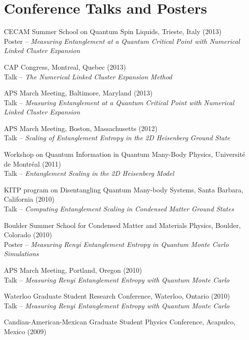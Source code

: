 \documentclass[letterpaper]{article}
\renewenvironment{itemize}{
  \begin{list}{}{
    \setlength{\leftmargin}{1.5em}
  }
}{
  \end{list}
}
\begin{document}
\section*{Conference Talks and Posters}

\begin{itemize}
\item CECAM Summer School on Quantum Spin Liquids, Trieste, Italy (2013) \\
	Poster --  {\it Measuring Entanglement at a Quantum Critical Point with Numerical Linked Cluster Expansion}
\item CAP Congress, Montreal, Quebec (2013) \\
	Talk --  {\it The Numerical Linked Cluster Expansion Method}
\item APS March Meeting, Baltimore, Maryland (2013) \\
	Talk --  {\it Measuring Entanglement at a Quantum Critical Point with Numerical Linked Cluster Expansion}
\item APS March Meeting, Boston, Massachusetts (2012) \\
	Talk --  {\it Scaling of Entanglement Entropy in the 2D Heisenberg Ground State}
\item Workshop on Quantum Information in Quantum Many-Body Physics, Universit\'e de Montr\'eal  (2011) \\ Talk --  {\it Entanglement Scaling in the 2D Heisenberg Model}
\item KITP program on Disentangling Quantum Many-body Systems, Santa Barbara, California (2010) \\
 	Talk -- {\it Computing Entanglement Scaling in Condensed Matter Ground States}
\item Boulder Summer School for Condensed Matter and Materials Physics, Boulder, Colorado (2010)\\
	Poster -- {\it Measuring Renyi Entanglement Entropy in Quantum Monte Carlo Simulations}
\item APS March Meeting, Portland, Oregon (2010) \\
	Talk --  {\it Measuring Renyi Entanglement Entropy with Quantum Monte Carlo}
\item Waterloo Graduate Student Research Conference, Waterloo, Ontario (2010) \\
	Talk --  {\it Measuring Renyi Entanglement Entropy with Quantum Monte Carlo}
\item Candian-American-Mexican Graduate Student Physics Conference, Acapulco, Mexico (2009) \\

\end{itemize}
\end{document}

